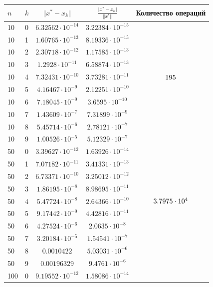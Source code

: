 \documentclass[english]{article}
\begin{document}
\begin{center}
  \begin{longtable}{l|l|c|c|c}
    \(n\) & \(k\) & \(\Vert x^* - x_k \Vert\) & \(\frac{\Vert x^* - x_k \Vert}{\Vert x^* \Vert}\) & Количество операций\\
    \hline
    10 & 0 & \(6.32562\cdot 10^{-14}\) & \(3.22384\cdot 10^{-15}\) & \\
    10 & 1 & \(1.60765\cdot 10^{-13}\) & \(8.19336\cdot 10^{-15}\) & \\
    10 & 2 & \(2.30718\cdot 10^{-12}\) & \(1.17585\cdot 10^{-13}\) & \\
    10 & 3 & \(1.2928\cdot 10^{-11}\) & \(6.58874\cdot 10^{-13}\) & \\
    10 & 4 & \(7.32431\cdot 10^{-10}\) & \(3.73281\cdot 10^{-11}\) & \({\large 195}\)\\
    10 & 5 & \(4.16467\cdot 10^{-9}\) & \(2.12251\cdot 10^{-10}\) & \\
    10 & 6 & \(7.18045\cdot 10^{-9}\) & \(3.6595\cdot 10^{-10}\) & \\
    10 & 7 & \(1.43609\cdot 10^{-7}\) & \(7.31899\cdot 10^{-9}\) & \\
    10 & 8 & \(5.45714\cdot 10^{-6}\) & \(2.78121\cdot 10^{-7}\) & \\
    10 & 9 & \(1.00526\cdot 10^{-5}\) & \(5.12329\cdot 10^{-7}\) & \\
    \hline
    50 & 0 & \(3.39627\cdot 10^{-12}\) & \(1.63926\cdot 10^{-14}\) & \\
    50 & 1 & \(7.07182\cdot 10^{-11}\) & \(3.41331\cdot 10^{-13}\) & \\
    50 & 2 & \(6.73371\cdot 10^{-10}\) & \(3.25012\cdot 10^{-12}\) & \\
    50 & 3 & \(1.86195\cdot 10^{-8}\) & \(8.98695\cdot 10^{-11}\) & \\
    50 & 4 & \(5.47724\cdot 10^{-8}\) & \(2.64366\cdot 10^{-10}\) & \({\large 3.7975 \cdot 10^4}\) \\
    50 & 5 & \(9.17442\cdot 10^{-9}\) & \(4.42816\cdot 10^{-11}\) & \\
    50 & 6 & \(4.27524\cdot 10^{-6}\) & \(2.0635\cdot 10^{-8}\) & \\
    50 & 7 & \(3.20184\cdot 10^{-5}\) & \(1.54541\cdot 10^{-7}\) & \\
    50 & 8 & \(0.0010422\) & \(5.03031\cdot 10^{-6}\) & \\
    50 & 9 & \(0.00196329\) & \(9.4761\cdot 10^{-6}\) & \\
    \hline
    100 & 0 & \(9.19552\cdot 10^{-12}\) & \(1.58086\cdot 10^{-14}\) & \\

\end{longtable}
\end{center}
\end{document}
